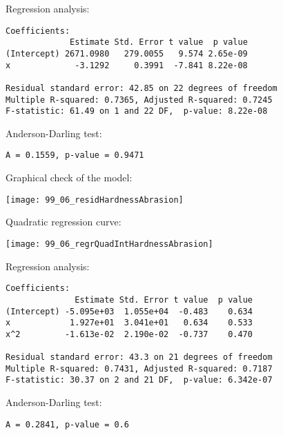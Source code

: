 \begin{frame}[fragile]
  Regression analysis:\\
  \begin{small}
    \begin{verbatim}
Coefficients:
             Estimate Std. Error t value  p value   
(Intercept) 2671.0980   279.0055   9.574 2.65e-09
x             -3.1292     0.3991  -7.841 8.22e-08

Residual standard error: 42.85 on 22 degrees of freedom
Multiple R-squared: 0.7365,	Adjusted R-squared: 0.7245 
F-statistic: 61.49 on 1 and 22 DF,  p-value: 8.22e-08 
    \end{verbatim}
  \end{small}
  Anderson-Darling test:\\
  \begin{small}
    \begin{verbatim}
A = 0.1559, p-value = 0.9471
    \end{verbatim}
  \end{small}
\end{frame}

\begin{frame}
  Graphical check of the model:\\
  \vspace{.3cm}
  \begin{center}
    \texttt{[image: 99\_06\_residHardnessAbrasion]}
  \end{center}
\end{frame}

\begin{frame}
  Quadratic regression curve:\\
  \vspace{.3cm}
  \begin{center}
    \texttt{[image: 99\_06\_regrQuadIntHardnessAbrasion]}
  \end{center}
\end{frame}

\begin{frame}[fragile]
  Regression analysis:\\
  \begin{small}
    \begin{verbatim}
Coefficients:
              Estimate Std. Error t value  p value
(Intercept) -5.095e+03  1.055e+04  -0.483    0.634
x            1.927e+01  3.041e+01   0.634    0.533
x^2         -1.613e-02  2.190e-02  -0.737    0.470

Residual standard error: 43.3 on 21 degrees of freedom
Multiple R-squared: 0.7431,	Adjusted R-squared: 0.7187 
F-statistic: 30.37 on 2 and 21 DF,  p-value: 6.342e-07 
    \end{verbatim}
  \end{small}
  Anderson-Darling test:\\
  \begin{small}
    \begin{verbatim}
A = 0.2841, p-value = 0.6
    \end{verbatim}
  \end{small}
\end{frame}

